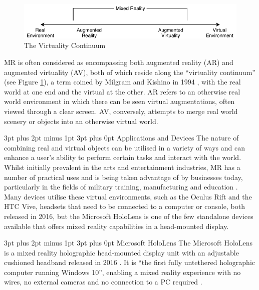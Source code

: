 \documentclass[12pt,a4paper,oneside]{article}
\makeatletter
\renewcommand\subsubsection{\@startsection {subsubsection}{1}{0mm} %
	                           {3pt plus 2pt minus 1pt} %
	                           {3pt plus 0pt} %
	                           {\normalfont\bfseries}}
\renewcommand\subsection{\@startsection {subsection}{1}{0mm} %
                               {3pt plus 2pt minus 1pt} %
                               {3pt plus 0pt} %
                               {\large\bfseries}}
\makeatother
\begin{document}
\begin{figure}[!h]
	\centering
	\includegraphics[width=\textwidth]{images/virtualitycontinuum}
	\caption{The Virtuality Continuum}
	\label{fig_mr}
\end{figure}

MR is often considered as encompassing both augmented reality (AR) and augmented virtuality (AV), both of which reside along the ``virtuality continuum'' (see Figure \ref{fig_mr}), a term coined by Milgram and Kishino in 1994  \cite{milgram94}, with the real world at one end and the virtual at the other. AR refers to an otherwise real world environment in which there can be seen virtual augmentations, often viewed through a clear screen. AV, conversely, attempts to merge real world scenery or objects into an otherwise virtual world.

\subsubsection{Applications and Devices}
The nature of combining real and virtual objects can be utilised in a variety of ways and can enhance a user's ability to perform certain tasks and interact with the world. Whilst initially prevalent in the arts and entertainment industries, MR has a number of practical uses and is being taken advantage of by businesses today, particularly in the fields of military training, manufacturing and education \cite{evans17, hughes97}. Many devices utilise these virtual environments, such as the Oculus Rift and the HTC Vive, headsets that need to be connected to a computer or console, both released in 2016, but the Microsoft HoloLens is one of the few standalone devices available that offers mixed reality capabilities in a head-mounted display.

\subsection{Microsoft HoloLens}
The Microsoft HoloLens is a mixed reality holographic head-mounted display unit with an adjustable cushioned headband released in 2016 \cite{microsoftcorp}. It is ``the first fully untethered holographic computer running Windows 10'', enabling a mixed reality experience with no wires, no external cameras and no connection to a PC required \cite{holmdahl15}.
\end{document}
